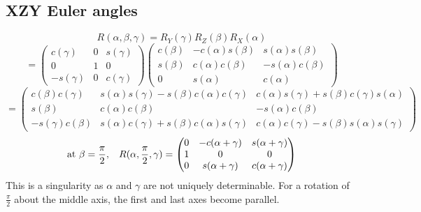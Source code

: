 \documentclass[11pt]{article}
\begin{document}
\subsection*{XZY Euler angles}
\begin{equation*}
    R(\alpha, \beta, \gamma) = R_Y(\gamma) R_Z(\beta) R_X(\alpha)
\end{equation*}
\begin{equation*}
    = \begin{pmatrix}
        c(\gamma) & 0 & s(\gamma) \\
        0 & 1 & 0 \\
        -s(\gamma) & 0 & c(\gamma)
    \end{pmatrix}
    \begin{pmatrix}
        c(\beta) & -c(\alpha)s(\beta) & s(\alpha)s(\beta) \\ 
        s(\beta) & c(\alpha)c(\beta) & -s(\alpha)c(\beta) \\
        0 & s(\alpha) & c(\alpha)
    \end{pmatrix}
\end{equation*}
\begin{equation*}
    =
    \begin{pmatrix}
        c(\beta)c(\gamma) & s(\alpha)s(\gamma) - s(\beta)c(\alpha)c(\gamma) & c(\alpha)s(\gamma) + s(\beta)c(\gamma)s(\alpha) \\
        s(\beta) & c(\alpha)c(\beta) & -s(\alpha)c(\beta) \\
        -s(\gamma)c(\beta) & s(\alpha)c(\gamma)+s(\beta)c(\alpha)s(\gamma) & c(\alpha)c(\gamma)-s(\beta)s(\alpha)s(\gamma)
    \end{pmatrix}
\end{equation*}
\begin{equation*}
    \text{at } \beta = \frac{\pi}{2}, \hspace{3mm} R(\alpha, \frac{\pi}{2}, \gamma) =
    \begin{pmatrix}
        0 & -c(\alpha+\gamma) & s(\alpha + \gamma) \\
        1 & 0 & 0 \\
        0 & s(\alpha + \gamma) & c(\alpha + \gamma)
    \end{pmatrix}
\end{equation*}
This is a singularity as $\alpha$ and $\gamma$ are not uniquely determinable. For a rotation of $\frac{\pi}{2}$ about the middle axis, the first and last axes become parallel.
\end{document}
